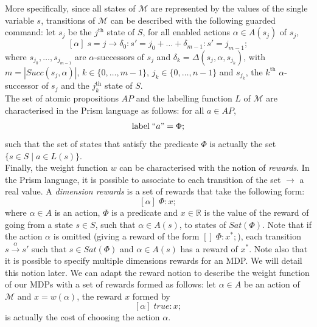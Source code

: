 More specifically, since all states of $\mathcal{M}$ are represented by the values of the single variable $s$, transitions of $\mathcal{M}$ can be described with the following guarded command:
let $s_j$ be the $j^{\text{th}}$ state of $S$, for all enabled actions $\alpha \in A(s_j)$ of $s_j$,
\[
  [\alpha] \; s=j \rightarrow \delta_0: s'=j_0 + \dots + \delta_{m-1}:  s'=j_{m-1};
\]
where $s_{j_0}, \dots, s_{j_{m-1}}$ are $\alpha$-successors of $s_j$ and $\delta_k = \Delta(s_j, \alpha, s_{j_k})$,
with  $m=|Succ(s_j,\alpha)|$, $k \in \{0, \dots, m-1\}$, $j_k \in \{0, \dots, n-1\}$ and $s_{j_k}$, the $k^\text{th}$ $\alpha$-successor of $s_j$ and the $j_k^\text{th}$ state of $S$. \\

The set of atomic propositions $AP$ and the labelling function $L$ of $\mathcal{M}$ are characterised in the Prism language as follows: for all $a \in AP$,
\[
  \text{label} \; ``a" = \Phi;
\]
such that the set of states that satisfy the predicate $\Phi$ is actually the set $\{ s \in S \; | \; a \in L(s) \}$. \\

%

Finally, the weight function $w$ can be characterised with the notion of \textit{rewards}. In the Prism language, it is possible to associate to each transition
of the set %
$\rightarrow$
a real value. A \textit{dimension rewards} is a set of rewards that take the following form:
\[
  [\alpha] \; \Phi: x;
\]
where $\alpha \in A$ is an action, $\Phi$ is a predicate and $x \in \mathbb{R}$
is the value of the reward of going from a state $s \in S$, such that $\alpha \in A(s)$, to states of $Sat(\Phi)$. Note that if the action $\alpha$ is omitted (giving a reward of the form $[]\; \Phi: x^*;$), each transition $s \xrightarrow{\,\alpha\,} s'$ such that $s \in Sat(\Phi)$ and $\alpha \in A(s)$
has a reward of $x^*$. Note also that it is possible to specify multiple dimensions rewards for an MDP. We will detail this notion later.
We can adapt the reward notion to describe the weight function of our MDPs with a set of rewards formed as follows:
let $\alpha \in A$ be an action of $\mathcal{M}$ and $x = w(\alpha)$, the reward $x$ formed by
\[
  [\alpha] \; true: x;
\]
is actually the cost of choosing the action $\alpha$.

